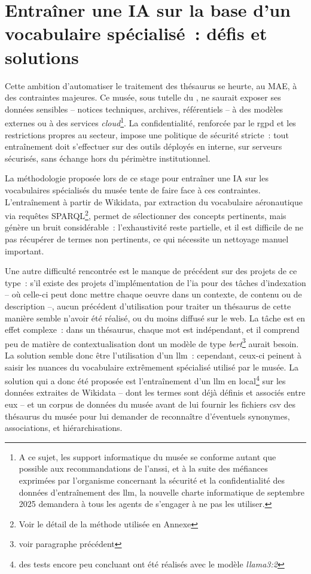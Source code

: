 \section{\label{III-C-2}Entraîner une IA sur la base d’un vocabulaire spécialisé~: défis et solutions}

Cette ambition d’automatiser le traitement des thésaurus se heurte, au MAE, à des contraintes majeures. Ce musée, sous tutelle du \minarm, ne saurait exposer ses données sensibles -- notices techniques, archives, référentiels -- à des modèles externes ou à des services \textit{cloud}\footnote{A ce sujet, les support informatique du musée se conforme autant que possible aux recommandations de l'\ac{anssi}, et à la suite des méfiances exprimées par l'organisme concernant la sécurité et la confidentialité des données d'entraînement des \ac{llm}, la nouvelle charte informatique de septembre 2025 demandera à tous les agents de s'engager à ne pas les utiliser.}. La confidentialité, renforcée par le \ac{rgpd} et les restrictions propres au secteur, impose une politique de sécurité stricte~: tout entraînement doit s’effectuer sur des outils déployés en interne, sur serveurs sécurisés, sans échange hors du périmètre institutionnel.

La méthodologie proposée lors de ce stage pour entraîner une IA sur les vocabulaires spécialisés du musée tente de faire face à ces contraintes. L’entraînement à partir de Wikidata, par extraction du vocabulaire aéronautique via requêtes SPARQL\footnote{Voir le détail de la méthode utilisée en Annexe }, permet de sélectionner des concepts pertinents, mais génère un bruit considérable~: l'exhaustivité reste partielle, et il est difficile de ne pas récupérer de termes non pertinents, ce qui nécessite un nettoyage manuel important.

Une autre difficulté rencontrée est le manque de précédent sur des projets de ce type~: s'il existe des projets d'implémentation de l'\ac{ia} pour des tâches d'indexation -- où celle-ci peut donc mettre chaque oeuvre dans un contexte, de contenu ou de description --, aucun précédent d'utilisation pour traiter un thésaurus de cette manière semble n'avoir été réalisé, ou du moins diffusé sur le web. La tâche est en effet complexe~: dans un thésaurus, chaque mot est indépendant, et il comprend peu de matière de contextualisation dont un modèle de type \textit{bert}\footnote{voir paragraphe précédent} aurait besoin. La solution semble donc être l'utilisation d'un \ac{llm}~: cependant, ceux-ci peinent à saisir les nuances du vocabulaire extrêmement spécialisé utilisé par le musée. La solution qui a donc été proposée est l'entraînement d'un \ac{llm} en local\footnote{des tests encore peu concluant ont été réalisés avec le modèle \textit{llama3:2}} sur les données extraites de Wikidata -- dont les termes sont déjà définis et associés entre eux -- et un corpus de données du musée avant de lui fournir les fichiers csv des thésaurus du musée pour lui demander de reconnaître d'éventuels synonymes, associations, et hiérarchisations. 

